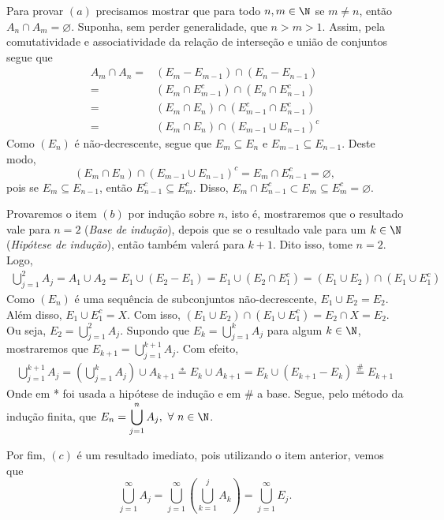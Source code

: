 \begin{prova}
    Para provar $(a)$ precisamos mostrar que para todo $n,m \in \N$ se $m \neq n$, então $A_n \cap A_m = \varnothing$.
    Suponha, sem perder generalidade, que $n > m > 1$.
    Assim, pela comutatividade e associatividade da relação de interseção e união de conjuntos segue que
    \begin{align*}
        A_m\cap A_n =& (E_m - E_{m -1}) \cap (E_n - E_{n -1})\\
        =& (E_m \cap E_{m -1}^c) \cap (E_n \cap E_{n -1}^c)\\
        =& (E_m \cap E_n) \cap ( E_{m -1}^c\cap E_{n -1}^c)\\
        =& (E_m \cap E_n) \cap \left( E_{m -1}\cup E_{n -1}\right)^c
    \end{align*}
	Como $(E_n)$ é não-decrescente, segue que $E_m \subseteq E_n$ e $E_{m-1}\subseteq E_{n-1}$.
    Deste modo, 
    $$
    (E_m \cap E_n) \cap \left( E_{m -1}\cup E_{n -1}\right)^c
    =
    E_m \cap E_{n-1}^c
    = \varnothing,
    $$
	pois se $E_{m} \subseteq E_{n-1}$, então $E_{n-1}^c \subseteq E_{m}^c$.
	Disso, 
	$
	E_{m} \cap E_{n-1}^c 
	\subset 
	E_{m} 
	\subseteq 
	E_{m}^c
	=\varnothing.
	$
	
    Provaremos o item $(b)$ por indução sobre $n$, isto é,
 	mostraremos que o resultado vale para $n = 2$ (\textit{Base de indução}), depois que se o resultado vale para um $k \in \N$ (\textit{Hipótese de indução}), então também valerá para $k+1$.
 	Dito isso, tome $n = 2$. Logo, 
 	\begin{align*}
 		\displaystyle \bigcup_{j = 1}^2 A_j 
 		=
 		A_1 \cup A_2
 		=
 		E_1\cup (E_2 - E_1)
 		=
 		E_1\cup (E_2 \cap E_1^c)
 		=
 		(E_1\cup E_2) \cap (E_1 \cup E_1^c)
 	\end{align*}
 	Como $(E_n)$ é uma sequência de subconjuntos não-decrescente,  $E_1\cup E_2 = E_2$.
 	Além disso, $E_1 \cup E_1^c = X$.
 	Com isso, 
 	$
 	(E_1\cup E_2) \cap (E_1 \cup E_1^c)
 	=
 	E_2 \cap X
 	=
 	E_2.
 	$
 	Ou seja, 
 	$E_2 = \displaystyle \bigcup_{j = 1}^2 A_j$.
 	Supondo que 
 	$
 	\displaystyle
 	E_k = \bigcup_{j = 1}^k A_j
 	$ 
 	para algum $k \in \N$, mostraremos que
 	$
 	\displaystyle
 	E_{k+1} = \bigcup_{j = 1}^{k+1} A_j
 	$.
 	Com efeito, 
 	\begin{align*}
 		\bigcup_{j = 1}^{k+1} A_j 
 		=
 		\left(\bigcup_{j = 1}^{k} A_j\right) \cup A_{k+1}
 		\overset{*}{=}
 		E_{k} \cup A_{k+1}
 		=
 		E_{k} \cup (E_{k+1}-E_{k})
 		\overset{\#}{=}
 		E_{k+1}
 	\end{align*}
 	Onde em * foi usada a hipótese de indução e em \# a base.
 	Segue, pelo método da indução finita, que
 	$E_n = \displaystyle \bigcup_{j = 1}^n A_j,\ \forall\ n \in \N$.
	
    Por fim, $(c)$ é um resultado imediato, pois utilizando o item anterior, vemos que 
    $$
    \bigcup_{j = 1}^\infty A_j 
    = 
    \bigcup_{j=1}^\infty\left(
    \bigcup_{k = 1}^j A_k\right)
    = 
    \bigcup_{j = 1}^\infty E_j .
    $$

\end{prova}

